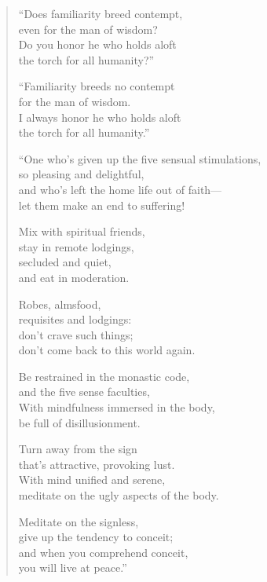 \documentclass[12pt,openany]{book}%
\begin{document}
\begin{verse}%
“Does familiarity breed contempt, \\
even for the man of wisdom? \\
Do you honor he who holds aloft \\
the torch for all humanity?” 

“Familiarity breeds no contempt \\
for the man of wisdom. \\
I always honor he who holds aloft \\
the torch for all humanity.” 

“One who’s given up the five sensual stimulations, \\
so pleasing and delightful, \\
and who’s left the home life out of faith—\\
let them make an end to suffering! 

Mix with spiritual friends, \\
stay in remote lodgings, \\
secluded and quiet, \\
and eat in moderation. 

Robes, almsfood, \\
requisites and lodgings: \\
don’t crave such things; \\
don’t come back to this world again. 

Be restrained in the monastic code, \\
and the five sense faculties, \\
With mindfulness immersed in the body, \\
be full of disillusionment. 

Turn away from the sign \\
that’s attractive, provoking lust. \\
With mind unified and serene, \\
meditate on the ugly aspects of the body. 

Meditate on the signless, \\
give up the tendency to conceit; \\
and when you comprehend conceit, \\
you will live at peace.” 

%
\end{verse}
\end{document}
